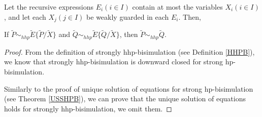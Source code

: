 \begin{theorem}\label{USSHHPB}
Let the recursive expressions $E_i(i\in I)$ contain at most the variables $X_i(i\in I)$, and let each $X_j(j\in I)$ be weakly guarded in each $E_i$. Then,

If $\widetilde{P}\sim_{hhp} \widetilde{E}\{\widetilde{P}/\widetilde{X}\}$ and $\widetilde{Q}\sim_{hhp} \widetilde{E}\{\widetilde{Q}/\widetilde{X}\}$, then $\widetilde{P}\sim_{hhp} \widetilde{Q}$.
\end{theorem}

\begin{proof}
From the definition of strongly hhp-bisimulation (see Definition \ref{HHPB}), we know that strongly hhp-bisimulation is downward closed for strong hp-bisimulation.

Similarly to the proof of unique solution of equations for strong hp-bisimulation (see Theorem \ref{USSHPB}), we can prove that the unique solution of equations holds for strongly hhp-bisimulation, we omit them.
\end{proof}
